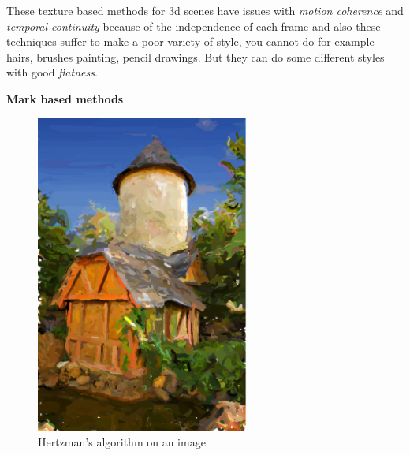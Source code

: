 These texture based methods for 3d scenes have issues with \textit{motion coherence} and \textit{temporal continuity} because of the independence of each frame and also these techniques suffer to make a poor variety of style, you cannot do for example hairs, brushes painting, pencil drawings. But they can do some different styles with good \textit{flatness}.\newline

\textbf{Mark based methods}

\begin{figure}
    \begin{center}

    \includegraphics[scale=0.5]{pics/hertzmann_algo.png}
    \end{center}
    \caption{Hertzman's algorithm on an image \cite{rosin_stroke_2013}}
    \label{Hertzman_algo}
\end{figure}

